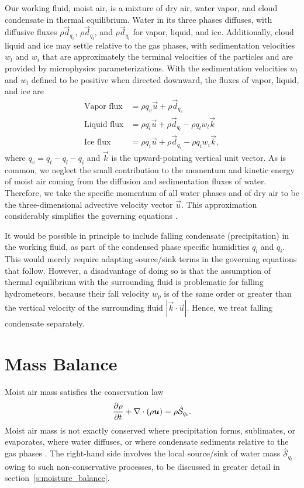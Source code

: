 \documentclass{report}
\begin{document}
Our working fluid, moist air, is a mixture of dry air, water vapor, and cloud condensate in thermal equilibrium. Water in its three phases diffuses, with diffusive fluxes $\rho \vec{d}_{q_v}$, $\rho \vec{d}_{q_l}$, and $\rho \vec{d}_{q_i}$ for vapor, liquid, and ice. Additionally, cloud liquid and ice may settle relative to the gas phases, with sedimentation velocities $w_l$ and $w_i$ that are approximately the terminal velocities of the particles and are provided by microphysics parameterizations. With the sedimentation velocities $w_l$ and $w_l$ defined to be positive when directed downward, the fluxes of vapor, liquid, and ice are
\begin{subequations}
\begin{align}
    \text{Vapor flux}  &= \rho q_v \vec{u}  + \rho \vec{d}_{q_v}\\
    \text{Liquid flux}  &= \rho q_l \vec{u}  + \rho \vec{d}_{q_l} - \rho q_l w_l  \vec{k}\\
    \text{Ice flux} &= \rho q_i \vec{u} + \rho \vec{d}_{q_i} - \rho q_i w_i  \vec{k},
\end{align}
\end{subequations}
where $q_v = q_t - q_l - q_i$ and $\vec{k}$ is the upward-pointing vertical unit vector. As is common, we neglect the small contribution to the momentum and kinetic energy of moist air coming from the diffusion and sedimentation fluxes of water. Therefore, we take the specific momentum of all water phases and of dry air to be the three-dimensional advective velocity vector $\vec{u}$. This approximation considerably simplifies the governing equations \citep{Romps08a}.

It would be possible in principle to include falling condensate (precipitation) in the working fluid, as part of the condensed phase specific humidities $q_l$ and $q_i$. This would merely require adapting source/sink terms in the governing equations that follow. However, a disadvantage of doing so is that the assumption of thermal equilibrium with the surrounding fluid is problematic for falling hydrometeors, because their fall velocity $w_{p}$ is of the same order or greater than the vertical velocity of the surrounding fluid $|\vec{k} \cdot \vec{u}|$. Hence, we treat falling condensate separately.

\section{Mass Balance}

Moist air mass satisfies the conservation law
\begin{equation}
\frac{\partial \rho}{\partial t} + \nabla \cdot (\rho\boldsymbol{{u}}) = \rho \mathcal{\hat S}_{q_t}.
\label{eq:governing_equations/mass}
\end{equation}
Moist air mass is not exactly conserved where precipitation forms, sublimates, or evaporates, where water diffuses, or where condensate sediments relative to the gas phases \citep{Bott08a, Romps08a}. The  right-hand side involves the local source/sink of water mass $\mathcal{\hat S}_{q_t}$ owing to such non-conservative processes, to be discussed in greater detail in section~\ref{s:moisture_balance}.
\end{document}
